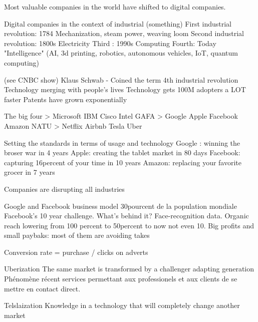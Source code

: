 Most valuable companies in the world have shifted to digital companies.

Digital companies in the context of industrial (something)
First industrial revolution: 1784 Mechanization, steam power, weaving loom
Second industrial revolution: 1800s Electricity
Third : 1990s Computing
Fourth: Today "Intelligence" (AI, 3d printing, robotics, autonomous vehicles, IoT, quantum computing)

(see CNBC show)
Klaus Schwab - Coined the term 4th industrial revolution
Technology merging with people's lives
Technology gets 100M adopters a LOT faster
Patents have grown exponentially

The big four > Microsoft IBM Cisco Intel
GAFA > Google Apple Facebook Amazon
NATU > Netflix Airbnb Tesla Uber

Setting the standards in terms of usage and technology
Google : winning the broser war in 4 years
Apple: creating the tablet market in 80 days
Facebook: capturing 16percent of your time in 10 years
Amazon: replacing your favorite grocer in 7 years

Companies are disrupting all industries

Google and Facebook business model
30pourcent de la population mondiale
Facebook's 10 year challenge. What's behind it? Face-recognition data.
Organic reach lowering from 100 percent to 50percent to now not even 10.
Big profits and small paybaks: most of them are avoiding takes

Conversion rate = purchase / clicks on adverts

Uberization
The same market is transformed by a challenger adapting generation
Phénomène récent services permettant aux professionels et aux clients de se mettre en contact direct.

Telslaization
Knowledge in a technology that will completely change another market

